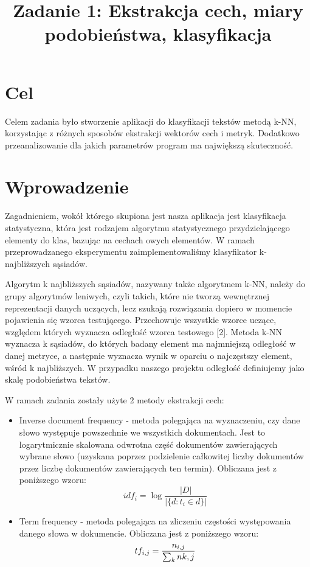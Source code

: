 \documentclass{classrep}
\author{
  \studentinfo{Piotr Traczyk}{195733} \and
  \studentinfo{Bartosz Jurczewski}{210209}
}
\title{Zadanie 1: Ekstrakcja cech, miary podobieństwa, klasyfikacja}
\begin{document}
\maketitle


\section{Cel}
Celem zadania było stworzenie aplikacji do klasyfikacji tekstów metodą k-NN, korzystając z różnych sposobów ekstrakcji wektorów cech i metryk.
Dodatkowo przeanalizowanie dla jakich parametrów program ma największą skuteczność.

\section{Wprowadzenie}
Zagadnieniem, wokół którego skupiona jest nasza aplikacja jest klasyfikacja statystyczna, która jest rodzajem algorytmu statystycznego przydzielającego elementy do klas, bazując na cechach owych elementów. W ramach przeprowadzanego eksperymentu zaimplementowaliśmy klasyfikator k-najbliższych sąsiadów. \newline

Algorytm k najbliższych sąsiadów, nazywany także algorytmem k-NN, należy do grupy algorytmów leniwych, czyli takich, które nie tworzą wewnętrznej reprezentacji danych uczących, lecz szukają rozwiązania dopiero w momencie pojawienia się wzorca testującego. Przechowuje wszystkie wzorce uczące, względem których wyznacza odległość wzorca testowego [2]. Metoda k-NN wyznacza k sąsiadów, do których badany element ma najmniejszą odległość w danej metryce, a następnie wyznacza wynik w oparciu o najczęstszy element, wśród k najbliższych. W przypadku naszego projektu odległość definiujemy jako skalę podobieństwa tekstów. \newline

W ramach zadania zostały użyte 2 metody ekstrakcji cech: \newline
\begin{itemize}[label=$\circ$]

\item Inverse document frequency - metoda polegająca na wyznaczeniu, czy dane słowo występuje powszechnie we wszystkich dokumentach. Jest to logarytmicznie skalowana odwrotna część dokumentów zawierających wybrane słowo (uzyskana poprzez podzielenie całkowitej liczby dokumentów przez liczbę dokumentów zawierających ten termin). Obliczana jest z poniższego wzoru:
$$
idf_{i}
= \log\frac{|D|}{|\{d : t_{i} \in d\}|}
$$

\item Term frequency - metoda polegająca na zliczeniu częstości występowania danego słowa w dokumencie. Obliczana jest z poniższego wzoru:
$$
tf_{i,j}
= \frac{n_{i,j}}{\sum_{k}n{k,j}}\\[2\baselineskip]
$$
\end{itemize}
\end{document}
